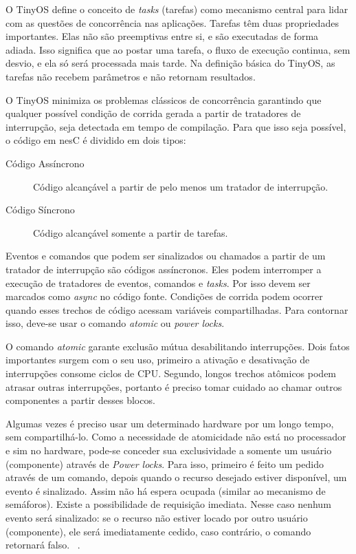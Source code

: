 O TinyOS define o conceito de {\em tasks} (tarefas) como mecanismo central para
lidar com as questões de concorrência nas aplicações. 
Tarefas têm duas propriedades importantes. Elas não são preemptivas entre si, e são
executadas de forma adiada. Isso significa que ao postar uma tarefa, o fluxo de execução continua,
sem desvio, e ela só será processada mais tarde. 
Na definição básica do TinyOS, as tarefas não recebem parâmetros e não retornam resultados. 

O TinyOS minimiza os problemas clássicos de concorrência garantindo que qualquer possível condição de
corrida gerada a partir de tratadores de interrupção, seja detectada em tempo de compilação. 
Para que isso seja possível, o código em nesC é dividido em dois tipos:
\begin{description}
    \item[Código Assíncrono] Código alcançável a partir de pelo menos um tratador de interrupção.
    \item[Código Síncrono] Código alcançável somente a partir de tarefas.
\end{description}

Eventos e comandos que podem ser sinalizados ou chamados a partir de um tratador de interrupção são códigos assíncronos.
Eles podem interromper a execução de tratadores de eventos, comandos e \textit{tasks}. 
Por isso devem ser marcados como \textit{async} no código fonte. 
Condições de corrida podem ocorrer quando esses trechos de código acessam variáveis compartilhadas.
Para contornar isso, deve-se usar o comando \textit{atomic} ou \textit{power locks}.

O comando \textit{atomic} garante exclusão mútua desabilitando interrupções. Dois fatos
importantes surgem com o seu uso, primeiro a ativação e desativação de interrupções consome ciclos de CPU. Segundo,
longos trechos atômicos podem atrasar outras interrupções, portanto é preciso tomar cuidado ao chamar outros componentes
a partir desses blocos.

Algumas vezes é preciso usar um determinado hardware por um longo tempo, sem compartilhá-lo. 
Como a necessidade de atomicidade não está no processador e sim no hardware, 
pode-se conceder sua exclusividade a somente um usuário (componente) através de
\textit{Power locks}. Para isso, primeiro é feito um pedido através de um comando, depois quando o recurso desejado
estiver disponível, um evento é sinalizado. Assim não há espera ocupada (similar ao mecanismo de semáforos). 
Existe a possibilidade de requisição imediata. 
Nesse caso nenhum evento será sinalizado: se o recurso não estiver locado por outro usuário (componente), ele será
imediatamente cedido, caso contrário, o comando retornará falso. 
~\cite[Cap.11]{LevisGay/09}.

